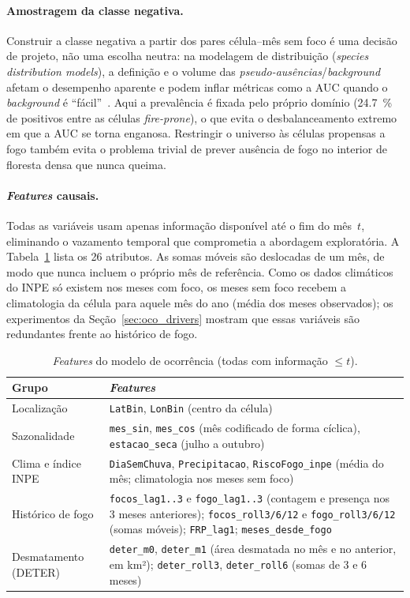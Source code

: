 \documentclass[tcc2]{uftex}
\begin{document}
\paragraph{Amostragem da classe negativa.} Construir a classe negativa a partir dos pares célula--mês sem foco é uma decisão de projeto, não uma escolha neutra: na modelagem de distribuição (\emph{species distribution models}), a definição e o volume das \emph{pseudo-ausências}/\emph{background} afetam o desempenho aparente e podem inflar métricas como a AUC quando o \emph{background} é ``fácil''~\cite{barbetmassin2012pseudo,phillips2009sample,lobo2008auc}. Aqui a prevalência é fixada pelo próprio domínio (\SI{24,7}{\percent} de positivos entre as células \emph{fire-prone}), o que evita o desbalanceamento extremo em que a AUC se torna enganosa. Restringir o universo às células propensas a fogo também evita o problema trivial de prever ausência de fogo no interior de floresta densa que nunca queima.

\paragraph{\emph{Features} causais.} Todas as variáveis usam apenas informação disponível até o fim do mês~\(t\), eliminando o vazamento temporal que comprometia a abordagem exploratória. A Tabela~\ref{tab:metod_features} lista os 26 atributos. As somas móveis são deslocadas de um mês, de modo que nunca incluem o próprio mês de referência. Como os dados climáticos do INPE só existem nos meses com foco, os meses sem foco recebem a climatologia da célula para aquele mês do ano (média dos meses observados); os experimentos da Seção~\ref{sec:oco_drivers} mostram que essas variáveis são redundantes frente ao histórico de fogo.

\begin{table}[h]
\centering
\caption{\emph{Features} do modelo de ocorrência (todas com informação \(\leq t\)).}
\label{tab:metod_features}
\small
\begin{tabular}{lp{9.5cm}}
\toprule
\textbf{Grupo} & \textbf{\emph{Features}} \\
\midrule
Localização & \texttt{LatBin}, \texttt{LonBin} (centro da célula) \\
Sazonalidade & \texttt{mes\_sin}, \texttt{mes\_cos} (mês codificado de forma cíclica), \texttt{estacao\_seca} (julho a outubro) \\
Clima e índice INPE & \texttt{DiaSemChuva}, \texttt{Precipitacao}, \texttt{RiscoFogo\_inpe} (média do mês; climatologia nos meses sem foco) \\
Histórico de fogo & \texttt{focos\_lag1..3} e \texttt{fogo\_lag1..3} (contagem e presença nos 3 meses anteriores); \texttt{focos\_roll3/6/12} e \texttt{fogo\_roll3/6/12} (somas móveis); \texttt{FRP\_lag1}; \texttt{meses\_desde\_fogo} \\
Desmatamento (DETER) & \texttt{deter\_m0}, \texttt{deter\_m1} (área desmatada no mês e no anterior, em km²); \texttt{deter\_roll3}, \texttt{deter\_roll6} (somas de 3 e 6 meses) \\
\bottomrule
\end{tabular}
\end{table}
\end{document}
